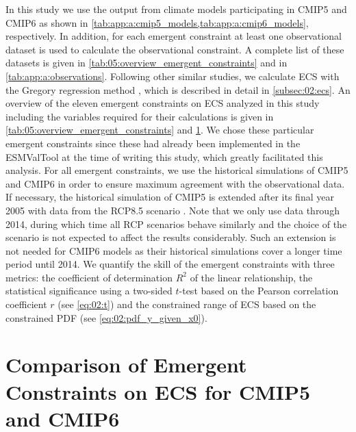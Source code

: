 In this study we use the output from climate models participating in
\acs{CMIP}5 and \acs{CMIP}6 as shown in
\cref{tab:app:a:cmip5_models,tab:app:a:cmip6_models}, respectively. In
addition, for each emergent constraint at least one observational dataset is
used to calculate the observational constraint. A complete list of these
datasets is given in \cref{tab:05:overview_emergent_constraints} and in
\cref{tab:app:a:observations}. Following other similar studies, we calculate
\ac{ECS} with the Gregory regression method \autocite{Gregory2004}, which is
described in detail in \cref{subsec:02:ecs}. An overview of the eleven emergent
constraints on \ac{ECS} analyzed in this study including the variables required
for their calculations is given in \cref{tab:05:overview_emergent_constraints}
and \cref{sec:05:comparison_of_emergent_constraints}. We chose these particular
emergent constraints since these had already been implemented in the
\ac{ESMValTool} at the time of writing this study, which greatly facilitated
this analysis. For all emergent constraints, we use the historical simulations
of \acs{CMIP}5 and \acs{CMIP}6 in order to ensure maximum agreement with the
observational data. If necessary, the historical simulation of \acs{CMIP}5 is
extended after its final year 2005 with data from the \acs{RCP}8.5 scenario
\autocite{Riahi2011}. Note that we only use data through 2014, during which
time all \ac{RCP} scenarios behave similarly and the choice of the scenario is
not expected to affect the results considerably. Such an extension is not
needed for \acs{CMIP}6 models as their historical simulations cover a longer
time period until 2014. We quantify the skill of the emergent constraints with
three metrics: the coefficient of determination $R^2$ of the linear
relationship, the statistical significance using a two-sided $t$-test based on
the Pearson correlation coefficient $r$ (see \cref{eq:02:t}) and the
constrained range of \ac{ECS} based on the constrained \ac{PDF} (see
\cref{eq:02:pdf_y_given_x0}).


\section{Comparison of Emergent Constraints on \acs{ECS} for \acs{CMIP}5 and
  \acs{CMIP}6}
\label{sec:05:comparison_of_emergent_constraints}

